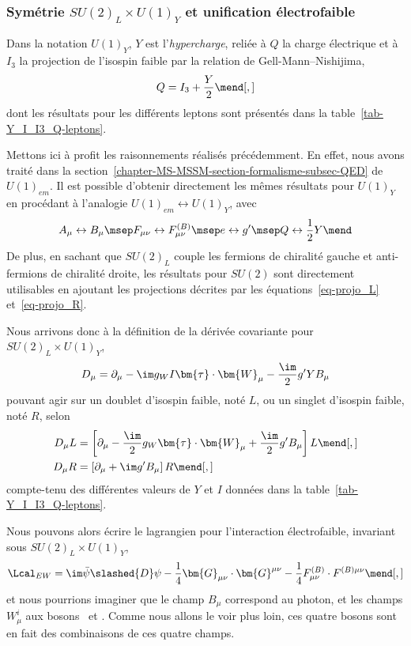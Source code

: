 \subsubsection{Symétrie $SU(2)_L \times U(1)_Y$ et unification électrofaible}\label{chapter-MS-MSSM-section-formalisme-subsec-EW-U1}
Dans la notation $U(1)_Y$, $Y$ est l'\emph{hypercharge}, reliée à $Q$ la charge électrique et à $I_3$ la projection de l'isospin faible par la relation de Gell-Mann--Nishijima,
\begin{equation}
Q = I_3 + \frac{Y}{2}
\mend[,]
\end{equation}
dont les résultats pour les différents leptons sont présentés dans la table~\ref{tab-Y_I_I3_Q-leptons}.
\par Mettons ici à profit les raisonnements réalisés précédemment. En effet, nous avons traité dans la section~\ref{chapter-MS-MSSM-section-formalisme-subsec-QED} de $U(1)_{em}$. Il est possible d'obtenir directement les mêmes résultats pour $U(1)_Y$ en procédant à l'analogie $U(1)_{em}\leftrightarrow U(1)_Y$, avec
\begin{equation}
A_\mu \leftrightarrow B_\mu
\msep
F_{\mu\nu} \leftrightarrow F^{(B)}_{\mu\nu}
\msep
e \leftrightarrow g'
\msep
Q \leftrightarrow \frac{1}{2}Y
\mend
\end{equation}
De plus, en sachant que $SU(2)_L$ couple les fermions de chiralité gauche et anti-fermions de chiralité droite, les résultats pour $SU(2)$ sont directement utilisables en ajoutant les projections décrites par les équations~\eqref{eq-projo_L} et~\eqref{eq-projo_R}.
\par Nous arrivons donc à la définition de la dérivée covariante pour $SU(2)_L \times U(1)_Y$,
\begin{equation}
D_\mu = \partial_\mu - \im g_WI \bm{\tau}\cdot\bm{W}_\mu - \frac{\im}{2}g'YB_\mu
\label{eq-definition_Dmu_EW}
\end{equation}
pouvant agir sur un doublet d'isospin faible, noté $L$, ou un singlet d'isospin faible, noté $R$, selon
\begin{align}
D_\mu L &= \left[ \partial_\mu - \frac{\im}{2}g_W \bm{\tau}\cdot\bm{W}_\mu + \frac{\im}{2}g'B_\mu \right] L
\mend[,]
\\
D_\mu R &= \left[ \partial_\mu + \im g'B_\mu \right] R
\mend[,]
\end{align}
compte-tenu des différentes valeurs de $Y$ et $I$ données dans la table~\ref{tab-Y_I_I3_Q-leptons}.
\par Nous pouvons alors écrire le lagrangien pour l'interaction électrofaible, invariant sous $SU(2)_L\times U(1)_Y$,
\begin{equation}
\Lcal_{EW}
=
\im \bar{\psi} \slashed{D} \psi - \frac{1}{4} \bm{G}_{\mu\nu} \cdot \bm{G}^{\mu\nu} - \frac{1}{4} F^{(B)}_{\mu\nu} \cdot F^{(B)\mu\nu}
\mend[,]
\label{eq-chapter-MS-MSSM-section-formalisme-subsec-EW-LSU2LU1Y}
\end{equation}
et nous pourrions imaginer que le champ $B_\mu$ correspond au photon, et les champs $W^i_\mu$ aux bosons \Wbosonpm\ et \Zboson. Comme nous allons le voir plus loin, ces quatre bosons sont en fait des combinaisons de ces quatre champs.
